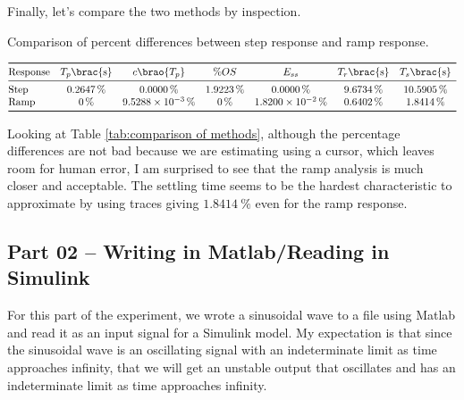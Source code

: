 \documentclass[12pt]{article}
\DeclarePairedDelimiter\brao()%
\DeclarePairedDelimiter\brac[]%
\begin{document}
Finally, let's compare the two methods by inspection.

\begin{table}[h]
    \centering
    \caption{Comparison of percent differences between step response and ramp response.}
	\[
		\begin{array}{@{}l*7S@{}}
		\toprule
			\text{Response} & T_p \brac{\si\second} & c\brao{T_p} & \si\percent OS & \text{$E_{ss}$} & T_r \brac{\si\second} & T_s \brac{\si\second}
		\\*
		\midrule
			\text{Step} & \SI{0.2647}\percent & \SI{0.0000}\percent & \SI{1.9223}\percent & \SI{0.0000}\percent & \SI{9.6734}\percent & \SI{10.5905}\percent
        \\*
			\text{Ramp} & \SI{0.}\percent & \SI{9.5288e-03}\percent & \SI{0.}\percent & \SI{1.8200e-02}\percent & \SI{0.6402}\percent & \SI{1.8414}\percent
		\\*
		\bottomrule
		\end{array}
	\]
    \label{tab:comparison of methods}
\end{table}

Looking at Table \ref{tab:comparison of methods},
although the percentage differences are not bad because we are estimating using a cursor, which leaves room for human error,
I am surprised to see that the ramp analysis is much closer and acceptable.
The settling time seems to be the hardest characteristic to approximate by using traces giving $\SI{1.8414}\percent$ even for the ramp response.

\subsection{Part 02 -- Writing in Matlab/Reading in Simulink}\label{ssc: I/O using matlab and simulink}

For this part of the experiment, we wrote a sinusoidal wave to a file using Matlab and read it as an input signal for a Simulink model.
My expectation is that since the sinusoidal wave is an oscillating signal with an indeterminate limit as time approaches infinity, that we will get an unstable output that oscillates and has an indeterminate limit as time approaches infinity.
\end{document}
